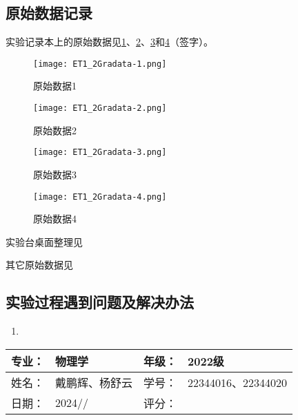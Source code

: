 \documentclass[dvipsnames, svgnames,a4paper,11pt]{article}
\begin{document}
	
	\clearpage
	\subsection{原始数据记录}
	实验记录本上的原始数据见\cref{fig:figdata-1}、\cref{fig:figdata-2}、\cref{fig:figdata-3}和\cref{fig:figdata-4}（签字）。
	
	\begin{figure}[htbp]
		\centering
		\texttt{[image: ET1\_2Gradata-1.png]}
		\caption{原始数据1}
		\label{fig:figdata-1}
	\end{figure}
	
	\begin{figure}[htbp]
		\centering
		\texttt{[image: ET1\_2Gradata-2.png]}
		\caption{原始数据2}
		\label{fig:figdata-2}
	\end{figure}
	
	\begin{figure}[htbp]
		\centering
		\texttt{[image: ET1\_2Gradata-3.png]}
		\caption{原始数据3}
		\label{fig:figdata-3}
	\end{figure}
	
	\begin{figure}[htbp]
		\centering
		\texttt{[image: ET1\_2Gradata-4.png]}
		\caption{原始数据4}
		\label{fig:figdata-4}
	\end{figure}
	
	实验台桌面整理见%
	
	其它原始数据见%
	
	\subsection{实验过程遇到问题及解决办法}
	\begin{enumerate}
		\item 
	\end{enumerate}
	
	
	
	\clearpage
	
	\begin{table}
		\renewcommand\arraystretch{1.7}
		\begin{tabularx}{\textwidth}{|X|X|X|X|}
			\hline
			专业：& 物理学 &年级：& 2022级\\
			\hline
			姓名： & 戴鹏辉、杨舒云 & 学号：& 22344016、22344020\\
			\hline
			日期：& 2024// & 评分： &\\
			\hline
		\end{tabularx}
	\end{table}
	
\end{document}
